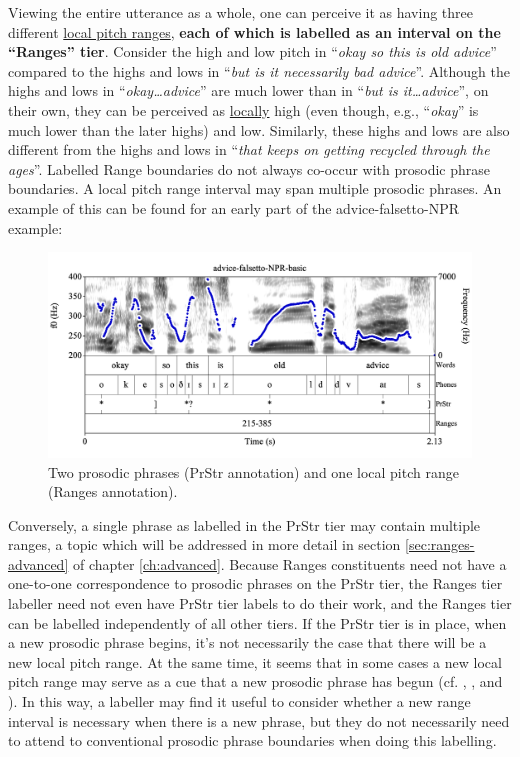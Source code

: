 \documentclass[11pt, twoside]{memoir}
\def\langtext#1{\textit{#1}}
\begin{document}
Viewing the entire utterance as a whole, one can perceive it as having three different \uline{local pitch ranges}, \textbf{each of which is labelled as an interval on the “Ranges” tier}. Consider the high and low pitch in “\langtext{okay so this is old advice}” compared to the highs and lows in “\langtext{but is it necessarily bad advice}”. Although the highs and lows in “\langtext{okay\ldots advice}” are much lower than in “\langtext{but is it\ldots advice}”, on their own, they can be perceived as \uline{locally} high (even though, e.g., “\langtext{okay}” is much lower than the later highs) and low. Similarly, these highs and lows are also different from the highs and lows in “\langtext{that keeps on getting recycled through the ages}”.
Labelled Range boundaries do not always co-occur with prosodic phrase boundaries. A local pitch range interval may span multiple prosodic phrases. An example of this can be found for an early part of the advice-falsetto-NPR example:
\begin{figure}[H]
\centering
\includegraphics[width=.875\linewidth]{Ranges-advice-falsetto-basic-first-range.png}
\caption{Two prosodic phrases (PrStr annotation) and one local pitch range (Ranges annotation).
\label{fig:advice-falsetto PrStr Ranges basic}
}
\end{figure}
Conversely, a single phrase as labelled in the PrStr tier may contain multiple ranges, a topic which will be addressed in more detail in section \ref{sec:ranges-advanced} of chapter \ref{ch:advanced}.
Because Ranges constituents need not have a one-to-one correspondence to prosodic phrases on the PrStr tier, the Ranges tier labeller need not even have PrStr tier labels to do their work, and the Ranges tier can be labelled independently of all other tiers. If the PrStr tier is in place, when a new prosodic phrase begins, it’s not necessarily the case that there will be a new local pitch range. At the same time, it seems that in some cases a new local pitch range may serve as a cue that a new prosodic phrase has begun (cf. \citealt{brugos15}, \citealt{brugos-18}, and \citealt{kim20}). In this way, a labeller may find it useful to consider whether a new range interval is necessary when there is a new phrase, but they do not necessarily need to attend to conventional prosodic phrase boundaries when doing this labelling.
\end{document}
